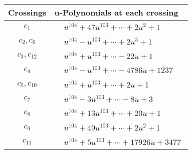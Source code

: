 \documentclass[1p]{elsarticle_modified}
\theoremstyle{definition}
\begin{document}
\begin{tabular}{m{50pt}|m{274pt}}
Crossings & \hspace{64pt}u-Polynomials at each crossing \\
\hline $$\begin{aligned}c_{1}\end{aligned}$$&$\begin{aligned}
&u^{104}+47 u^{103}+\cdots+2 u^2+1
\end{aligned}$\\
\hline $$\begin{aligned}c_{2},c_{6}\end{aligned}$$&$\begin{aligned}
&u^{104}- u^{103}+\cdots+2 u^3+1
\end{aligned}$\\
\hline $$\begin{aligned}c_{3},c_{12}\end{aligned}$$&$\begin{aligned}
&u^{104}+u^{103}+\cdots-22 u+1
\end{aligned}$\\
\hline $$\begin{aligned}c_{4}\end{aligned}$$&$\begin{aligned}
&u^{104}- u^{103}+\cdots-4786 u+1237
\end{aligned}$\\
\hline $$\begin{aligned}c_{5},c_{10}\end{aligned}$$&$\begin{aligned}
&u^{104}+u^{103}+\cdots+2 u+1
\end{aligned}$\\
\hline $$\begin{aligned}c_{7}\end{aligned}$$&$\begin{aligned}
&u^{104}-3 u^{103}+\cdots-8 u+3
\end{aligned}$\\
\hline $$\begin{aligned}c_{8}\end{aligned}$$&$\begin{aligned}
&u^{104}+13 u^{103}+\cdots+20 u+1
\end{aligned}$\\
\hline $$\begin{aligned}c_{9}\end{aligned}$$&$\begin{aligned}
&u^{104}+49 u^{103}+\cdots+2 u^2+1
\end{aligned}$\\
\hline $$\begin{aligned}c_{11}\end{aligned}$$&$\begin{aligned}
&u^{104}+5 u^{103}+\cdots+17926 u+3477
\end{aligned}$\\
\hline
\end{tabular}\newpage\renewcommand{\arraystretch}{1}
\end{document}
